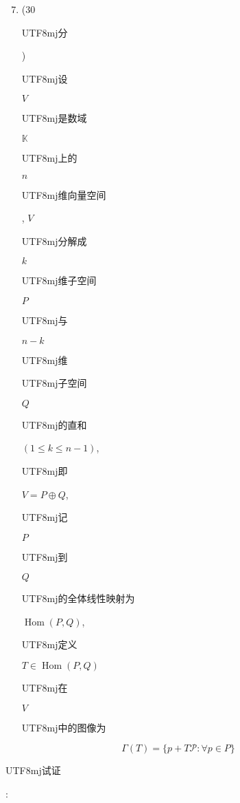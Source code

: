 \documentclass[10pt]{article}
\begin{document}
\begin{enumerate}
  \setcounter{enumi}{6}
  \item (30 \begin{CJK}{UTF8}{mj}分\end{CJK}) \begin{CJK}{UTF8}{mj}设\end{CJK} $V$ \begin{CJK}{UTF8}{mj}是数域\end{CJK} $\mathbb{K}$ \begin{CJK}{UTF8}{mj}上的\end{CJK} $n$ \begin{CJK}{UTF8}{mj}维向量空间\end{CJK}, $V$ \begin{CJK}{UTF8}{mj}分解成\end{CJK} $k$ \begin{CJK}{UTF8}{mj}维子空间\end{CJK} $P$ \begin{CJK}{UTF8}{mj}与\end{CJK} $n-k$ \begin{CJK}{UTF8}{mj}维\end{CJK} \begin{CJK}{UTF8}{mj}子空间\end{CJK} $Q$ \begin{CJK}{UTF8}{mj}的直和\end{CJK} $(1 \leq k \leq n-1)$, \begin{CJK}{UTF8}{mj}即\end{CJK} $V=P \oplus Q$, \begin{CJK}{UTF8}{mj}记\end{CJK} $P$ \begin{CJK}{UTF8}{mj}到\end{CJK} $Q$ \begin{CJK}{UTF8}{mj}的全体线性映射为\end{CJK} $\operatorname{Hom}(P, Q)$, \begin{CJK}{UTF8}{mj}定义\end{CJK} $T \in \operatorname{Hom}(P, Q)$ \begin{CJK}{UTF8}{mj}在\end{CJK} $V$ \begin{CJK}{UTF8}{mj}中的图像为\end{CJK}
\end{enumerate}
$$
\Gamma(T)=\{p+T \mathcal{P}: \forall p \in P\}
$$
\begin{CJK}{UTF8}{mj}试证\end{CJK}:
\end{document}
